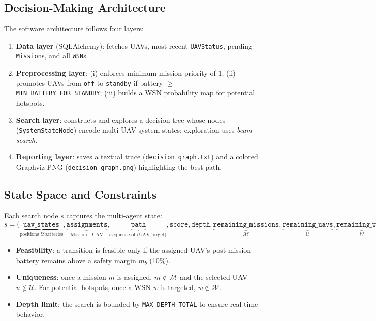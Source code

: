 \subsection*{Decision-Making Architecture}
The software architecture follows four layers:
\begin{enumerate}
  \item \textbf{Data layer} (SQLAlchemy): fetches UAVs, most recent \texttt{UAVStatus}, pending
        \texttt{Mission}s, and all \texttt{WSN}s.
  \item \textbf{Preprocessing layer}: (i) enforces minimum mission priority of 1; (ii) promotes UAVs
        from \texttt{off} to \texttt{standby} if battery \(\geq\) \texttt{MIN\_BATTERY\_FOR\_STANDBY}; (iii)
        builds a WSN probability map for potential hotspots.
  \item \textbf{Search layer}: constructs and explores a decision tree whose nodes (\texttt{SystemStateNode})
        encode multi-UAV system states; exploration uses \emph{beam search}.
  \item \textbf{Reporting layer}: saves a textual trace (\texttt{decision\_graph.txt}) and a colored
        Graphviz PNG (\texttt{decision\_graph.png}) highlighting the best path.
\end{enumerate}

\subsection*{State Space and Constraints}
Each search node \(s\) captures the multi-agent state:
\[
s = \Big(\underbrace{\texttt{uav\_states}}_{\text{positions \& batteries}},
           \underbrace{\texttt{assignments}}_{\text{Mission}\rightarrow\text{UAV}},
           \underbrace{\texttt{path}}_{\text{sequence of (UAV,target)}},
           \texttt{score}, \texttt{depth},
           \underbrace{\texttt{remaining\_missions}}_{\mathcal{M}},
           \underbrace{\texttt{remaining\_uavs}}_{\mathcal{U}},
           \underbrace{\texttt{remaining\_wsns}}_{\mathcal{W}}\Big).
\]
\begin{itemize}
  \item \textbf{Feasibility}: a transition is feasible only if the assigned UAV's post-mission
        battery remains above a safety margin \(m_b\) (10\%).
  \item \textbf{Uniqueness}: once a mission \(m\) is assigned, \(m\notin\mathcal{M}\) and the selected UAV
        \(u\notin\mathcal{U}\). For potential hotspots, once a WSN \(w\) is targeted, \(w\notin\mathcal{W}\).
  \item \textbf{Depth limit}: the search is bounded by \texttt{MAX\_DEPTH\_TOTAL} to ensure real-time behavior.
\end{itemize}


